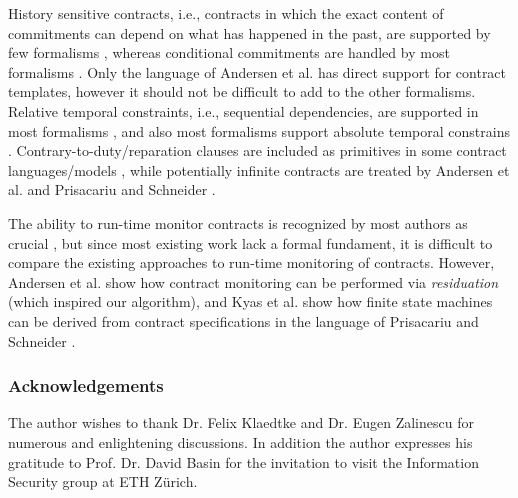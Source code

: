 \documentclass[orivec,final]{llncs-href}
\begin{document}
History sensitive contracts, i.e., contracts in which the exact
content of commitments can depend on what has happened in the past,
are supported by few formalisms
\cite{governatori06formalbcl,andersen06contracts}, whereas conditional
commitments are handled by most formalisms
\cite{lee88electroniccontracting,governatori06formalbcl,goodchild00b2b,prisacariu07cl,boulmakoul02integratedcontract,oren09towards}. Only
the language of Andersen et al. \cite{andersen06contracts} has direct
support for contract templates, however it should not be difficult to add
to the other formalisms. Relative temporal constraints, i.e.,
sequential dependencies, are supported in most formalisms
\cite{lee88electroniccontracting,xu04multipartycontracts,governatori06formalbcl,goodchild00b2b,andersen06contracts,molina04runtimemonitoring,oren09towards},
and also most formalisms support absolute temporal constrains
\cite{lee88electroniccontracting,governatori06formalbcl,goodchild00b2b,andersen06contracts,boulmakoul02integratedcontract,molina04runtimemonitoring}.
Contrary-to-duty/reparation clauses are included as primitives in some
contract languages/models
\cite{governatori06formalbcl,prisacariu07cl,boulmakoul02integratedcontract,oren09towards},
while potentially infinite contracts are treated by Andersen et
al. \cite{andersen06contracts} and Prisacariu and Schneider
\cite{prisacariu07cl}.

The ability to run-time monitor contracts is recognized by most
authors as crucial
\cite{xu04multipartycontracts,governatori06formalbcl,goodchild00b2b,prisacariu07cl,andersen06contracts,molina04runtimemonitoring},
but since most existing work lack a formal fundament, it is difficult
to compare the existing approaches to run-time monitoring of
contracts. However, Andersen et al. \cite{andersen06contracts} show
how contract monitoring can be performed via \emph{residuation} (which
inspired our algorithm), and Kyas et al. \cite{kyas08clrm} show how
finite state machines can be derived from contract specifications in
the language of Prisacariu and Schneider \cite{prisacariu07cl}. 

\subsubsection{Acknowledgements}
The author wishes to thank Dr. Felix Klaedtke and Dr. Eugen Zalinescu
for numerous and enlightening discussions. In addition the author
expresses his gratitude to Prof. Dr. David Basin for the invitation to
visit the Information Security group at ETH Zürich.
\end{document}
